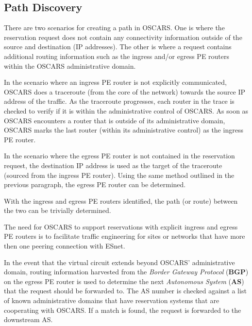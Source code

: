\documentclass[conference]{IEEEtran}
\begin{document}
\subsection{Path Discovery}
There are two scenarios for creating a path in OSCARS.  One is where the
reservation request does not contain any connectivity information outside of
the source and destination (IP addresses).  The other is where a request
contains additional routing information such as the ingress and/or egress 
PE routers within the OSCARS administrative domain.

In the scenario where an ingress PE router is not explicitly communicated, 
OSCARS does a traceroute (from the core of the network) towards the source IP 
address of the traffic. As the traceroute
progresses, each router in the trace is checked to verify if 
it is within the administrative control of OSCARS. As soon as OSCARS 
encounters a router that
is outside of its administrative domain, OSCARS marks the last router (within 
its administrative control) as the ingress PE router.

In the scenario where the egress PE router is not contained in the reservation 
request, 
the destination IP address is used as the target of the traceroute (sourced 
from the ingress PE router).
Using the same method outlined in the previous paragraph, the egress PE router 
can be determined.

With the ingress and egress PE routers identified, the path (or route) between 
the two can be trivially determined.

The need for OSCARS to support reservations with explicit ingress and egress PE
routers is to
facilitate traffic engineering for sites or networks that have more then one 
peering connection with ESnet.

In the event that the virtual circuit extends beyond OSCARS' administrative 
domain,
routing information harvested from the \emph{Border Gateway Protocol} 
(\textbf{BGP}) on the egress PE router is used to determine the next
\emph{Autonomous System} (\textbf{AS}) that the request should be forwarded 
to.   The AS number is
checked against a list of known administrative domains that have reservation 
systems
that are cooperating with OSCARS.  If a match is found, the request is 
forwarded to the downstream AS.
\end{document}
